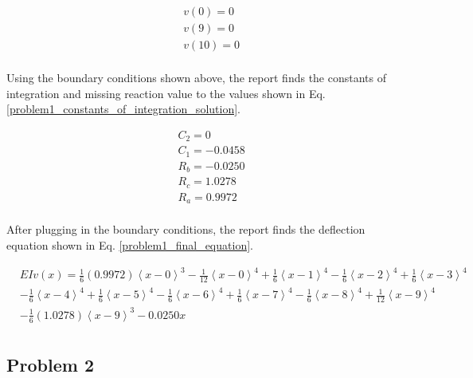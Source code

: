 \documentclass[a4paper]{article}
\begin{document}
\begin{equation}
\begin{split}
	& v(0) = 0 \\
	& v(9) = 0 \\
	& v(10) = 0 \\
\end{split}
\label{problem1_constants_of_integration}
\end{equation}

Using the boundary conditions shown above, the report finds the constants of integration and missing reaction value to the values shown in Eq. \ref{problem1_constants_of_integration_solution}.

\begin{equation}
\begin{split}
	& C_2 = 0 \\
	& C_1 = - 0.0458 \\
	& R_b = - 0.0250\\
	& R_c = 1.0278\\
	& R_a = 0.9972 \\
\end{split}
\label{problem1_constants_of_integration_solution}
\end{equation}

After plugging in the boundary conditions, the report finds the deflection equation shown in Eq. \ref{problem1_final_equation}.

\begin{equation}
\begin{split}
  & EI v(x) = \frac{1}{6}\left(0.9972\right)\left<x-0\right>^3 - \frac{1}{12}\left<x-0\right>^4 +  \frac{1}{6}\left<x-1\right>^4 - \frac{1}{6}\left<x-2\right>^4 + \frac{1}{6}\left<x-3\right>^4   \\      
& - \frac{1}{6}\left<x-4\right>^4 +  \frac{1}{6}\left<x-5\right>^4 - \frac{1}{6}\left<x-6\right>^4  +  \frac{1}{6}\left<x-7\right>^4 - \frac{1}{6}\left<x-8\right>^4 +  \frac{1}{12}\left<x-9\right>^4  \\
& - \frac{1}{6}\left(1.0278\right)\left<x-9\right>^3 - 0.0250x \\
\end{split}
\label{problem1_final_equation}
\end{equation}



\subsection{Problem 2}
\end{document}
